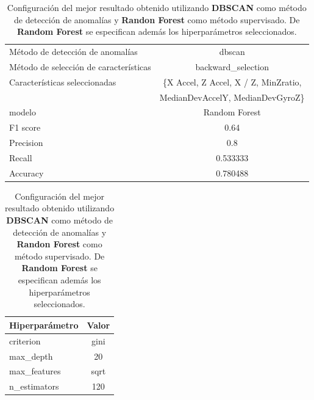 \begin{appendices}
		\begin{table}[htb]
			\centering
			\caption{Configuración del mejor resultado obtenido utilizando \textbf{DBSCAN} como método de detección de anomalías y \textbf{Randon Forest}
			como método supervisado. De \textbf{Random Forest} se especifican además los hiperparámetros seleccionados.}
			\label{table:35}
			\begin{tabular}{lc}
				\toprule
					  Método de detección de anomalías &                                             dbscan \\
				Método de selección de características &                                 backward\_selection \\
						 Características seleccionadas & \{X Accel, Z Accel, X / Z, MinZratio, \\
						                               &        MedianDevAccelY, MedianDevGyroZ\} \\
												modelo &                                      Random Forest \\
											  F1 score &                                               0.64 \\
											 Precision &                                                0.8 \\
												Recall &                                           0.533333 \\
											  Accuracy &                                           0.780488 \\
				\bottomrule
			\end{tabular}
			\newline
			\newline

			\begin{tabular}{lc}
				\toprule
				Hiperparámetro & Valor \\
				\midrule
					 criterion &  gini \\
					 max\_depth &    20 \\
				  max\_features &  sqrt \\
				  n\_estimators &   120 \\
				\bottomrule
			\end{tabular}
			

		\end{table}


\end{appendices}
